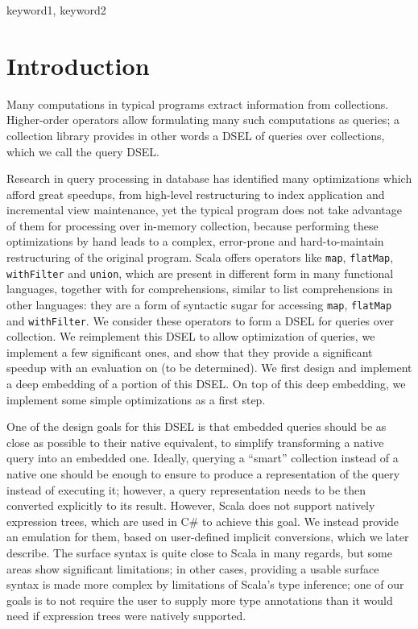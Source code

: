\documentclass[preprint,authoryear,10pt]{sigplanconf}
\begin{document}
\keywords
keyword1, keyword2




\section{Introduction}

Many computations in typical programs extract information from
collections. Higher-order operators allow formulating many such
computations as queries; a collection library provides in other words a
DSEL of queries over collections, which we call the query DSEL.

Research in query processing in database has identified many
optimizations which afford great speedups, from high-level restructuring
to index application and incremental view maintenance, yet the typical
program does not take advantage of them for processing over in-memory
collection, because performing these optimizations by hand leads to a
complex, error-prone and hard-to-maintain restructuring of the original
program. Scala offers operators like \texttt{map}, \texttt{flatMap},
\texttt{withFilter} and \texttt{union}, which are present in different
form in many functional languages, together with for comprehensions,
similar to list comprehensions in other languages: they are a form of
syntactic sugar for accessing \texttt{map}, \texttt{flatMap} and
\texttt{withFilter}. We consider these operators to form a DSEL for
queries over collection. We reimplement this DSEL to allow optimization
of queries, we implement a few significant ones, and show that they
provide a significant speedup with an evaluation on (to be determined).
We first design and implement a deep embedding of a portion of this
DSEL. On top of this deep embedding, we implement some simple
optimizations as a first step.

One of the design goals for this DSEL is that embedded queries should be
as close as possible to their native equivalent, to simplify
transforming a native query into an embedded one. Ideally, querying a
``smart'' collection instead of a native one should be enough to ensure
to produce a representation of the query instead of executing it;
however, a query representation needs to be then converted explicitly to
its result. However, Scala does not support natively expression trees,
which are used in C\# to achieve this goal. We instead provide an
emulation for them, based on user-defined implicit conversions, which we
later describe. The surface syntax is quite close to Scala in many
regards, but some areas show significant limitations; in other cases,
providing a usable surface syntax is made more complex by limitations of
Scala's type inference; one of our goals is to not require the user to
supply more type annotations than it would need if expression trees were
natively supported.
\end{document}
